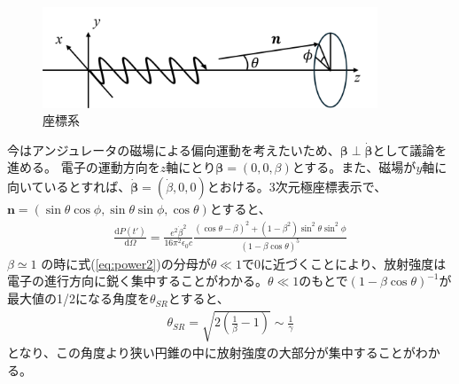 \documentclass[a4paper,11pt,uplatex]{jsbook}
\begin{document}
\begin{figure}[htbp]
  \centering
  \includegraphics[width=10cm]{image/2-cordinate.png}
  \caption{座標系}
\end{figure}
今はアンジュレータの磁場による偏向運動を考えたいため、$\bm{\beta} \perp \bm{\dot{\beta}}$として議論を進める。
電子の運動方向を$z$軸にとり$\bm{\beta} = (0,0,\beta)$とする。また、磁場が$y$軸に向いているとすれば、$\bm{\dot{\beta}} = (\dot{\beta},0,0)$とおける。3次元極座標表示で、$\bm{n} = (\sin\theta\cos\phi,\sin\theta\sin\phi,\cos\theta)$とすると、
\begin{eqnarray}\label{eq:power2}
  \frac{\text{d}P(t')}{\text{d}\Omega} = \frac{e^2\dot{\beta}^2}{16\pi^2 \epsilon_0 c}\frac{(\cos\theta - \beta)^2 + (1-\beta^2)\sin^2\theta\sin^2\phi}{(1-\beta \cos\theta)^5}
\end{eqnarray}
$\beta \simeq 1$ の時に式(\ref{eq:power2})の分母が$\theta \ll 1$で0に近づくことにより、放射強度は電子の進行方向に鋭く集中することがわかる。$\theta \ll 1$のもとで$(1-\beta\cos\theta)^{-1}$が最大値の1/2になる角度を$\theta_{SR}$とすると、
\begin{eqnarray}
  \theta_{SR} = \sqrt{2\left(\frac{1}{\beta} -1\right)} \sim \frac{1}{\gamma}
\end{eqnarray}
となり、この角度より狭い円錐の中に放射強度の大部分が集中することがわかる。
\end{document}
